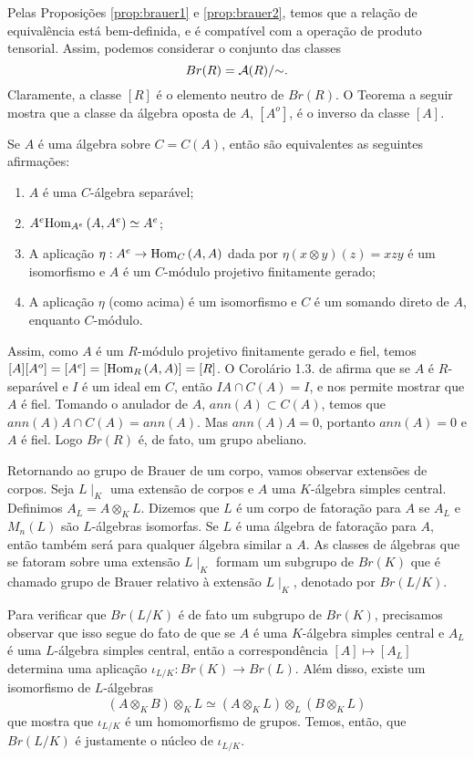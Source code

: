Pelas Proposições \ref{prop:brauer1} e \ref{prop:brauer2}, temos que a relação de equivalência está bem-definida, e é compatível com a operação de produto tensorial. Assim, podemos considerar o conjunto das classes \[Br(R) = \mathcal{A}(R)/{\sim}.\] Claramente, a classe $[R]$ é o elemento neutro de $Br(R)$. O Teorema a seguir mostra que a classe da álgebra oposta de $A$, $[A^o]$, é o inverso da classe $[A]$. %
\begin{teo}\cite[Theorem 2.1.]{brauer}
Se $A$ é uma álgebra sobre $C=C(A)$, então são equivalentes as seguintes afirmações:
\begin{enumerate}
    \item $A$ é uma $C$-álgebra separável;
    \item $A^e \textrm{Hom}_{A^e}\left( A,A^e \right)\simeq A^e$;
    \item A aplicação $\eta: A^e \rightarrow \textrm{Hom}_{C}\left( A,A \right)$ dada por $\eta(x\otimes y)(z) = xzy$ é um isomorfismo e $A$ é um $C$-módulo projetivo finitamente gerado;
    \item A aplicação $\eta$ (como acima) é um isomorfismo e $C$ é um somando direto de $A$, enquanto $C$-módulo.
\end{enumerate}
\end{teo}
Assim, como $A$ é um $R$-módulo projetivo finitamente gerado e fiel, temos $[A][A^o] = [A^e] = [\textrm{Hom}_{R}\left( A,A \right)] = [R]$. 
O Corolário 1.3. de \cite{brauer} afirma que se $A$ é $R$-separável e $I$ é um ideal em $C$, então $IA \cap C(A) = I$, e nos permite mostrar que $A$ é fiel. Tomando o anulador de $A$, $ann(A) \subset C(A)$, temos que $ann(A)A \cap C(A) = ann(A)$. Mas $ann(A) A = 0$, portanto $ann(A) = 0$ e $A$ é fiel. Logo $Br(R)$ é, de fato, um grupo abeliano. \par 
Retornando ao grupo de Brauer de um corpo, vamos observar extensões de corpos. Seja $L\mid_K$ uma extensão de corpos e $A$ uma $K$-álgebra simples central. Definimos $A_L = A\otimes_K L$. Dizemos que $L$ é um corpo de fatoração para $A$ se $A_L$ e $M_n(L)$ são $L$-álgebras isomorfas. Se $L$ é uma álgebra de fatoração para $A$, então também será para qualquer álgebra similar a $A$. As classes de álgebras que se fatoram sobre uma extensão $L\mid_K$ formam um subgrupo de $Br(K)$ que é chamado grupo de Brauer relativo à extensão $L\mid_K$, denotado por $Br(L/K)$. \par 
Para verificar que $Br(L/K)$ é de fato um subgrupo de $Br(K)$, precisamos observar que isso segue do fato de que se $A$ é uma $K$-álgebra simples central e $A_L$ é uma $L$-álgebra simples central, então a correspondência $[A] \mapsto [A_L]$ determina uma aplicação $\iota_{L/K}: Br(K) \rightarrow Br(L)$. Além disso, existe um isomorfismo de $L$-álgebras \[(A \otimes_K B) \otimes_K L \simeq (A\otimes_K L)\otimes_L (B\otimes_K L)\] que mostra que $\iota_{L/K}$ é um homomorfismo de grupos. Temos, então, que $Br(L/K)$ é justamente o núcleo de $\iota_{L/K}$. \par 
